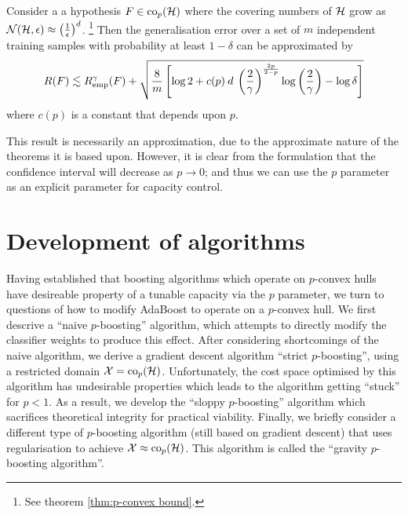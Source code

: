 \begin{theorem}
\label{thm:p convex generalisation}
Consider a a hypothesis $F \in \mathrm{co}_p(\mathcal{H})$ where the covering
numbers of $\mathcal{H}$ grow as $\mathcal{N}({\mathcal{H}}, {\epsilon}) \approx \left
( \frac{1}{\epsilon} \right) ^d$.%
\footnote{See theorem \ref{thm:p-convex bound}.}
Then the generalisation error over a set of $m$ independent training
samples with probability at least $1 - \delta$ can be approximated by 
%
\begin{equation}
R(F) \lesssim R_{\mathrm{emp}}^{\gamma}(F) + \sqrt{ \frac{8}{m} \left[ \log 2
+ c(p) \: d \: \left( \frac{2}{\gamma} \right)^{\frac{2p}{2-p}} \log
\left( \frac{2}{\gamma} \right) - \log \delta \right]}
\end{equation}
where $c(p)$ is a constant that depends upon $p$. 
%
\end{theorem}

This result is necessarily an approximation, due to the approximate
nature of the theorems it is based upon.  However, it is clear from
the formulation that the confidence interval will decrease as $p
\rightarrow 0$; and thus we can use the $p$ parameter as an explicit
parameter for capacity control.


\section{Development of algorithms}

Having established that boosting algorithms which operate on
$p$-convex hulls have desireable property of a tunable capacity via
the $p$ parameter, we turn to
questions of how to modify AdaBoost to operate on a $p$-convex hull.
We first descrive a ``naive $p$-boosting'' algorithm, which attempts
to directly modify the classifier weights to produce this effect.
After considering shortcomings of the naive algorithm, we derive a	
gradient descent algorithm ``strict $p$-boosting'', using a restricted
domain $\mathcal{X} = \mathrm{co}_p (\mathcal{H})$.  Unfortunately, the cost space
optimised by this algorithm has undesirable properties which leads to
the algorithm getting ``stuck'' for $p < 1$.  As a result, we develop
the ``sloppy $p$-boosting'' algorithm which sacrifices theoretical
integrity for practical viability.  Finally, we briefly consider a
different type of $p$-boosting algorithm (still based on gradient
descent) that uses regularisation to achieve $\mathcal{X} \approx
\mathrm{co}_p(\mathcal{H})$.  This algorithm is called the ``gravity $p$-boosting
algorithm''.


